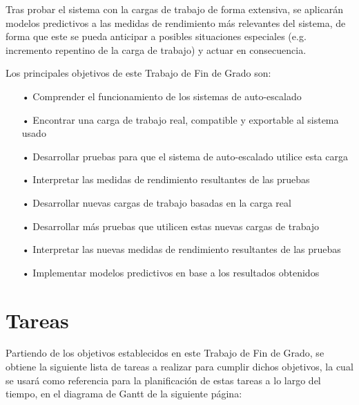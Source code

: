 Tras probar el sistema con la cargas de trabajo de forma extensiva, se aplicarán modelos predictivos a las medidas de rendimiento más relevantes del sistema, de forma que este se pueda anticipar a posibles situaciones especiales (e.g. incremento repentino de la carga de trabajo) y actuar en consecuencia.

Los principales objetivos de este Trabajo de Fin de Grado son:
\begin{itemize}
    \item[•] Comprender el funcionamiento de los sistemas de auto-escalado
    \item[•] Encontrar una carga de trabajo real, compatible y exportable al sistema usado
    \item[•] Desarrollar pruebas para que el sistema de auto-escalado utilice esta carga
    \item[•] Interpretar las medidas de rendimiento resultantes de las pruebas
    \item[•] Desarrollar nuevas cargas de trabajo basadas en la carga real
    \item[•] Desarrollar más pruebas que utilicen estas nuevas cargas de trabajo
    \item[•] Interpretar las nuevas medidas de rendimiento resultantes de las pruebas
    \item[•] Implementar modelos predictivos en base a los resultados obtenidos
\end{itemize}


\chapter*{Tareas}
Partiendo de los objetivos establecidos en este Trabajo de Fin de Grado, se obtiene la siguiente lista de tareas a realizar para cumplir dichos objetivos, la cual se usará como referencia para la planificación de estas tareas a lo largo del tiempo, en el diagrama de Gantt de la siguiente página:\\

